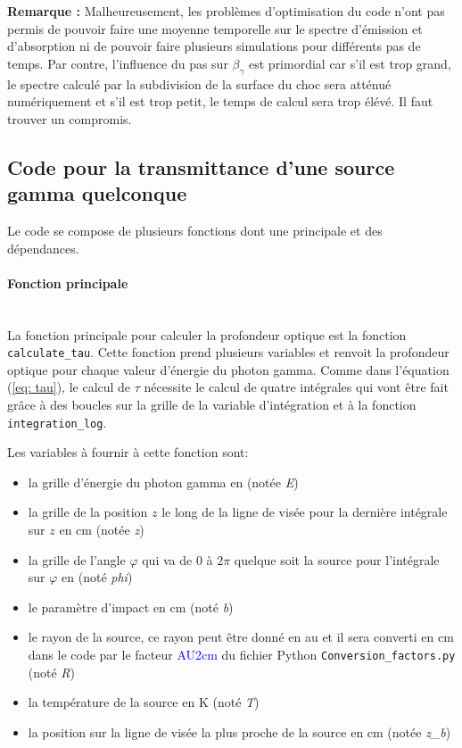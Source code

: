 \documentclass[a4paper,12pt,twoside]{article}
\newcommand{\nocontentsline}[3]{}
\newcommand{\tocless}[2]{\bgroup\let\addcontentsline=\nocontentsline#1{#2}\egroup}
\begin{document}
\textbf{Remarque :} Malheureusement, les problèmes d'optimisation du code n'ont pas permis de pouvoir faire une moyenne temporelle sur le spectre d'émission et d'absorption ni de pouvoir faire plusieurs simulations pour différents pas de temps. Par contre, l'influence du pas sur $\beta_\gamma$ est primordial car s'il est trop grand, le spectre calculé par la subdivision de la surface du choc sera atténué numériquement et s'il est trop petit, le temps de calcul sera trop élévé. Il faut trouver un compromis.
\newpage

\begin{appendices}
\tocless\section{Code pour la transmittance d'une source gamma quelconque}

Le code se compose de plusieurs fonctions dont une principale et des dépendances.

\paragraph*{Fonction principale} \hspace{0pt} \\

La fonction principale pour calculer la profondeur optique est la fonction \texttt{calculate\_tau}. Cette fonction prend plusieurs variables et renvoit la profondeur optique pour chaque valeur d'énergie du photon gamma. Comme dans l'équation (\ref{eq: tau}), le calcul de $\tau$ nécessite le calcul de quatre intégrales qui vont être fait grâce à des boucles sur la grille de la variable d'intégration et à la fonction \texttt{integration\_log}.

Les variables à fournir à cette fonction sont:
\begin{itemize}
	\item la grille d'énergie du photon gamma en \si{\erg} (notée \textit{E})
    \item la grille de la position $z$ le long de la ligne de visée pour la dernière intégrale sur $z$ en \si{\cm} (notée \textit{z})
    \item la grille de l'angle $\varphi$ qui va de $0$ à $2\pi$ quelque soit la source pour l'intégrale sur $\varphi$ en \si{\rad} (noté \textit{phi})
    \item le paramètre d'impact en \si{\cm} (noté \textit{b})
    \item le rayon de la source, ce rayon peut être donné en \si{\astronomicalunit} et il sera converti en \si{\cm} dans le code par le facteur \textcolor{blue}{AU2cm} du fichier Python \texttt{Conversion\_factors.py} (noté \textit{R})
    \item la température de la source en \si{\K} (noté \textit{T})
    \item la position sur la ligne de visée la plus proche de la source en \si{\cm} (notée \textit{z\_b})
\end{itemize}


\end{appendices}
\end{document}
